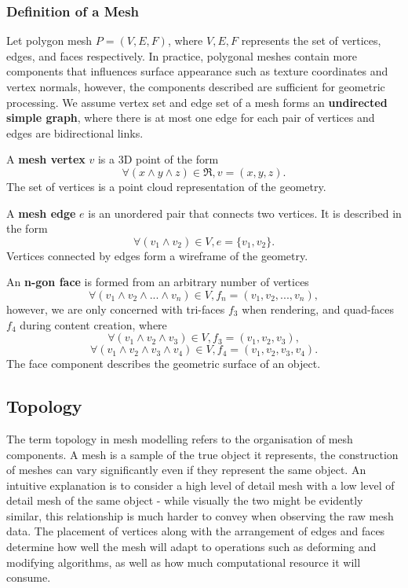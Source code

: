 \documentclass[ %
author={Dillon Keith Diep},
supervisor={Dr. Carl Henrik Ek},
degree={MEng},
title={ART-CG:},
subtitle={Assisted Real-time Content Generation of 3D Hair by Learning Manifolds},
type={Research},
year={2017} ]{dissertation}
\begin{document}
\subsubsection{Definition of a Mesh}
Let polygon mesh $P = (V, E, F)$, where $V, E, F$ represents the set of vertices, edges, and faces respectively. In practice, polygonal meshes contain more components that influences surface appearance such as texture coordinates and vertex normals, however, the components described are sufficient for geometric processing. We assume vertex set and edge set of a mesh forms an \textbf{undirected simple graph}, where there is at most one edge for each pair of vertices and edges are bidirectional links.

A \textbf{mesh vertex} $v$ is a 3D point of the form
$$\forall (x \land y \land z) \in \Re, v = (x, y, z).$$
The set of vertices is a point cloud representation of the geometry. 

A \textbf{mesh edge} $e$ is an unordered pair that connects two vertices. It is described in the form
$$\forall (v_1 \land v_2) \in V, e = \{v_1, v_2\}.$$
Vertices connected by edges form a wireframe of the geometry. 

An \textbf{n-gon face} is formed from an arbitrary number of vertices 
$$\forall (v_1 \land v_2 \land ... \land v_n) \in V, f_n = (v_1, v_2,..., v_n),$$ 
however, we are only concerned with tri-faces $f_3$ when rendering, and quad-faces $f_4$ during content creation, where
$$\forall (v_1 \land v_2 \land v_3) \in V, f_3 = (v_1, v_2, v_3),$$
$$\forall (v_1 \land v_2 \land v_3 \land v_4) \in V, f_4 = (v_1, v_2, v_3, v_4).$$
The face component describes the geometric surface of an object.

\subsection{Topology}
The term topology in mesh modelling refers to the organisation of mesh components\cite[p.91]{blenderstudio}. A mesh is a sample of the true object it represents, the construction of meshes can vary significantly even if they represent the same object. An intuitive explanation is to consider a high level of detail mesh with a low level of detail mesh of the same object - while visually the two might be evidently similar, this relationship is much harder to convey when observing the raw mesh data. The placement of vertices along with the arrangement of edges and faces determine how well the mesh will adapt to operations such as deforming and modifying algorithms, as well as how much computational resource it will consume.
\end{document}
